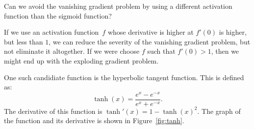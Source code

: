 \begin{exercise}
Can we avoid the vanishing gradient problem by using a different activation function 
than the sigmoid function?
\end{exercise}
\begin{solution}
If we use an activation function~$f$ whose derivative is higher at $f'(0)$ is higher, but
less than $1$, we can reduce the severity of the vanishing gradient problem, but not eliminate 
it altogether. If we were choose $f$ such that $f'(0) > 1$, then we might end up with the 
exploding gradient problem. 

One such candidiate function is the hyperbolic tangent function. This is defined as:
\[
    \tanh (x) = \frac{e^x - e^{-x}}{e^x + e^{-x}}.
\]
The derivative of this function is $\tanh ' (x) = 1 - \tanh (x)^2$. The graph of the 
function and its derivative is shown in Figure~\ref{fig:tanh}.


\end{solution}
